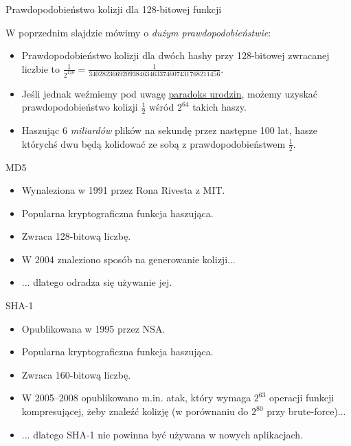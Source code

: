 \begin{frame}{Prawdopodobieństwo kolizji dla 128-bitowej funkcji}
	
	W poprzednim slajdzie mówimy o \emph{dużym prawdopodobieństwie}:

	\begin{itemize}
		\item Prawdopodobieństwo kolizji dla dwóch hashy przy 128-bitowej zwracanej liczbie to $\frac{1}{2^{128}}=\frac{1}{340282366920938463463374607431768211456}$.
		
		\item Jeśli jednak weźmiemy pod uwagę \href{http://en.wikipedia.org/wiki/Birthday_problem}{paradoks urodzin}, możemy uzyskać prawdopodobieństwo kolizji $\frac{1}{2}$ wśród $2^{64}$ takich haszy.
		
		\item Haszując 6 \emph{miliardów} plików na sekundę przez następne 100 lat, hasze którychś dwu będą kolidować ze sobą z prawdopodobieństwem $\frac{1}{2}$.
	\end{itemize}	
	
\end{frame}

\begin{frame}{MD5}
	\begin{itemize}
		\item Wynaleziona w 1991 przez Rona Rivesta z MIT.
		\item Popularna kryptograficzna funkcja haszująca.
		\item Zwraca 128-bitową liczbę.
		\item W 2004 znaleziono sposób na generowanie kolizji...
		\item ... dlatego odradza się używanie jej.
	\end{itemize}
\end{frame}

\begin{frame}{SHA-1}
	\begin{itemize}
		\item Opublikowana w 1995 przez NSA.
		\item Popularna kryptograficzna funkcja haszująca.
		\item Zwraca 160-bitową liczbę.
		\item W 2005--2008 opublikowano m.in. atak, który wymaga $2^{63}$ operacji funkcji kompresującej, żeby znaleźć kolizję (w porównaniu do $2^{80}$ przy brute-force)...
		\item ... dlatego SHA-1 nie powinna być używana w nowych aplikacjach.
	\end{itemize}
\end{frame}

